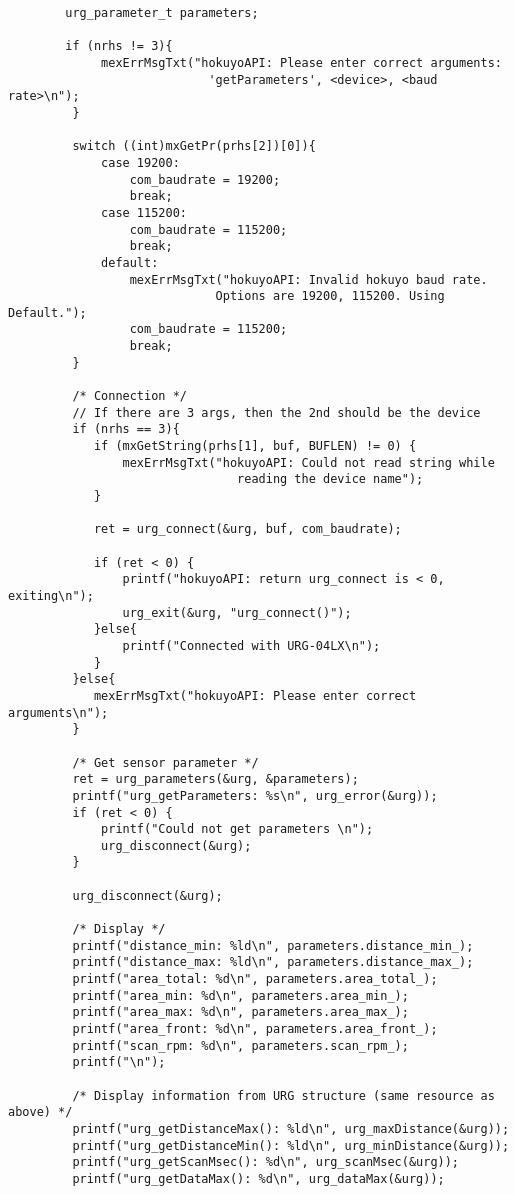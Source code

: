 \begin{lstlisting}
    	urg_parameter_t parameters;

        if (nrhs != 3){
             mexErrMsgTxt("hokuyoAPI: Please enter correct arguments:
                            'getParameters', <device>, <baud rate>\n");
         }

         switch ((int)mxGetPr(prhs[2])[0]){
             case 19200:
                 com_baudrate = 19200;
                 break;
             case 115200:
                 com_baudrate = 115200;
                 break;
             default:
                 mexErrMsgTxt("hokuyoAPI: Invalid hokuyo baud rate. 
                             Options are 19200, 115200. Using Default.");
                 com_baudrate = 115200;
                 break;
         }

         /* Connection */
         // If there are 3 args, then the 2nd should be the device
         if (nrhs == 3){
         	if (mxGetString(prhs[1], buf, BUFLEN) != 0) {
         		mexErrMsgTxt("hokuyoAPI: Could not read string while 
                                reading the device name");
         	}

         	ret = urg_connect(&urg, buf, com_baudrate);

         	if (ret < 0) {
         		printf("hokuyoAPI: return urg_connect is < 0, exiting\n");
         		urg_exit(&urg, "urg_connect()");
         	}else{
         		printf("Connected with URG-04LX\n");
         	}
         }else{
         	mexErrMsgTxt("hokuyoAPI: Please enter correct arguments\n");
         }

         /* Get sensor parameter */
         ret = urg_parameters(&urg, &parameters);
         printf("urg_getParameters: %s\n", urg_error(&urg));
         if (ret < 0) {
        	 printf("Could not get parameters \n");
        	 urg_disconnect(&urg);
         }

         urg_disconnect(&urg);

         /* Display */
         printf("distance_min: %ld\n", parameters.distance_min_);
         printf("distance_max: %ld\n", parameters.distance_max_);
         printf("area_total: %d\n", parameters.area_total_);
         printf("area_min: %d\n", parameters.area_min_);
         printf("area_max: %d\n", parameters.area_max_);
         printf("area_front: %d\n", parameters.area_front_);
         printf("scan_rpm: %d\n", parameters.scan_rpm_);
         printf("\n");

         /* Display information from URG structure (same resource as above) */
         printf("urg_getDistanceMax(): %ld\n", urg_maxDistance(&urg));
         printf("urg_getDistanceMin(): %ld\n", urg_minDistance(&urg));
         printf("urg_getScanMsec(): %d\n", urg_scanMsec(&urg));
         printf("urg_getDataMax(): %d\n", urg_dataMax(&urg));


\end{lstlisting}
